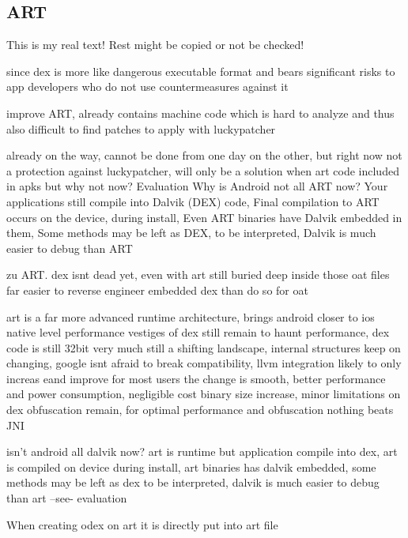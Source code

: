 \subsection{ART} \label{section:counter-external-art}
This is my real text! Rest might be copied or not be checked!

since dex is more like dangerous executable format and bears significant risks to app developers who do not use countermeasures against it

improve ART, already contains machine code which is hard to analyze and thus also difficult to find patches to apply with luckypatcher



already on the way, cannot be done from one day on the other, but right now not a protection against luckypatcher, will only be a solution when art code included in apks
but why not now?
%
Evaluation
Why is Android not all ART now? Your applications still compile into Dalvik (DEX) code, Final compilation to ART occurs on the device, during install, Even ART binaries have Dalvik embedded in them, Some methods may be left as DEX, to be interpreted, Dalvik is much easier to debug than ART\newline
\cite{andevconDalvikART}
%

%
zu ART.
dex isnt dead yet, even with art
still buried deep inside those oat files
far easier to reverse engineer embedded dex than do so for oat

art is a far more advanced runtime architecture, brings android closer to ios native level performance
vestiges of dex still remain to haunt performance, dex code is still 32bit
very much still a shifting landscape, internal structures keep on changing, google isnt afraid to break compatibility, llvm integration likely to only increas eand improve
for most users the change is smooth, better performance and power consumption, negligible cost binary size increase, minor limitations on dex obfuscation remain, for optimal performance and obfuscation nothing beats JNI

isn't android all dalvik now?
art is runtime but application compile into dex, art is compiled on device during install, art binaries has dalvik embedded, some methods may be left as dex to be interpreted, dalvik is much easier to debug than art --see- evaluation \newline

When creating odex on art it is directly put into art file

\cite{andevconDalvikART}
%
